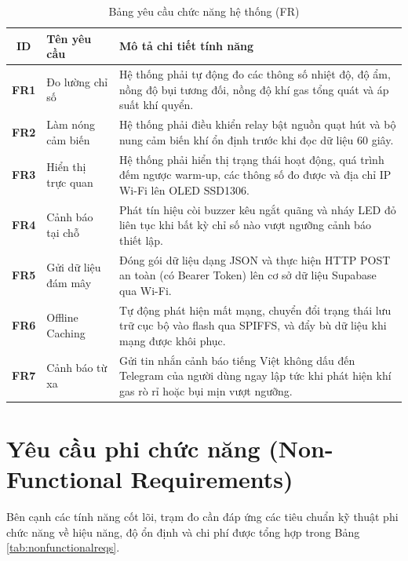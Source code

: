 \begin{table}[H]
\centering
\caption{Bảng yêu cầu chức năng hệ thống (FR)}
\label{tab:functionalreqs}
\begin{small}
\begin{tabular}{clp{10.0cm}}
\toprule
\textbf{ID} & \textbf{Tên yêu cầu} & \textbf{Mô tả chi tiết tính năng} \\
\midrule
\textbf{FR1} & Đo lường chỉ số & Hệ thống phải tự động đo các thông số nhiệt độ, độ ẩm, nồng độ bụi tương đối, nồng độ khí gas tổng quát và áp suất khí quyển. \\
\midrule
\textbf{FR2} & Làm nóng cảm biến & Hệ thống phải điều khiển relay bật nguồn quạt hút và bộ nung cảm biến khí ổn định trước khi đọc dữ liệu 60 giây. \\
\midrule
\textbf{FR3} & Hiển thị trực quan & Hệ thống phải hiển thị trạng thái hoạt động, quá trình đếm ngược warm-up, các thông số đo được và địa chỉ IP Wi-Fi lên OLED SSD1306. \\
\midrule
\textbf{FR4} & Cảnh báo tại chỗ & Phát tín hiệu còi buzzer kêu ngắt quãng và nháy LED đỏ liên tục khi bất kỳ chỉ số nào vượt ngưỡng cảnh báo thiết lập. \\
\midrule
\textbf{FR5} & Gửi dữ liệu đám mây & Đóng gói dữ liệu dạng JSON và thực hiện HTTP POST an toàn (có Bearer Token) lên cơ sở dữ liệu Supabase qua Wi-Fi. \\
\midrule
\textbf{FR6} & Offline Caching & Tự động phát hiện mất mạng, chuyển đổi trạng thái lưu trữ cục bộ vào flash qua SPIFFS, và đẩy bù dữ liệu khi mạng được khôi phục. \\
\midrule
\textbf{FR7} & Cảnh báo từ xa & Gửi tin nhắn cảnh báo tiếng Việt không dấu đến Telegram của người dùng ngay lập tức khi phát hiện khí gas rò rỉ hoặc bụi mịn vượt ngưỡng. \\
\bottomrule
\end{tabular}
\end{small}
\end{table}

\section{Yêu cầu phi chức năng (Non-Functional Requirements)}
Bên cạnh các tính năng cốt lõi, trạm đo cần đáp ứng các tiêu chuẩn kỹ thuật phi chức năng về hiệu năng, độ ổn định và chi phí được tổng hợp trong Bảng \ref{tab:nonfunctionalreqs}.


